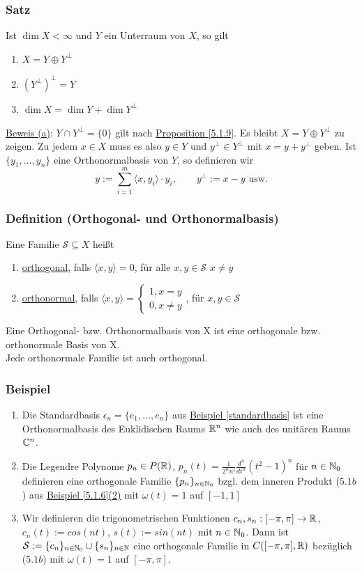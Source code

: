 \subsubsection{Satz}
\label{5.1.10}
Ist $\dim X<\infty$ und $Y$ ein Unterraum von $X$, so gilt
\alphabet
\begin{enumerate}
\item $X=Y\oplus Y^{\bot}$
\item $(Y^{\bot})^{\bot}=Y$
\item $\dim X=\dim Y+\dim Y^{\bot}$
\end{enumerate}
\underline{Beweis (a)}: $Y\cap Y^{\bot}=\{0\}$ gilt nach \hyperref[5.1.9]{Proposition \ref*{5.1.9}}. Es bleibt $X=Y\oplus Y^{\bot}$ zu zeigen. Zu jedem $x\in X$ muss es also $y\in Y$ und $y^{\bot}\in Y^{\bot}$ mit $x=y+y^{\bot}$ geben. Ist $\{y_1, \dots,y_n\}$ eine Orthonormalbasis von $Y$, so definieren wir
\[y:=\sum_{i=1}^m \langle x,y_i\rangle \cdot y_i,\qquad y^{\bot}:=x-y\text{ usw.}\]
\subsubsection{Definition (Orthogonal- und Orthonormalbasis)}
Eine Familie $\mathcal{S} \subseteq X$ heißt
\alphabet
\begin{enumerate}
\item \underline{orthogonal}, falls $\langle x,y\rangle=0$, für alle $x,y\in \mathcal{S}$ $x\neq y$
\item \underline{orthonormal}, falls $\langle x,y\rangle=\begin{cases}1,x=y\\0,x\neq y\end{cases}$, für $x,y\in \mathcal{S}$
\end{enumerate}
Eine Orthogonal- bzw. Orthonormalbasis von X ist eine orthogonale bzw. orthonormale Basis von X.\\
Jede orthonormale Familie ist auch orthogonal.
\subsubsection{Beispiel}
\label{5.1.12}
\numbers
\begin{enumerate}
\item Die Standardbasis $\epsilon_n=\{e_1,\dots,e_n\}$ aus \hyperref[standardbasis]{Beispiel \ref*{standardbasis}} ist eine Orthonormalbasis des Euklidischen Raums $\mathbb{R}^n$ wie auch des unitären Raums $\mathbb{C}^n$.
\item Die Legendre Polynome $p_n\in P(\mathbb{R})$, $p_n(t)=\frac{1}{2^n n!} \frac{d^n}{dt^n} (t^2-1)^n$ für $n\in\mathbb{N}_0$ definieren eine orthogonale Familie $\{p_n\}_{n\in\mathbb{N}_0}$ bzgl. dem inneren Produkt (\hyperref[5.1b]{$5.1b$}) aus \hyperref[5.1.6]{Beispiel \ref{5.1.6}(2)} mit $\omega(t)=1$ auf $[-1,1]$
\item Wir definieren die trigonometrischen Funktionen $c_n,s_n:[-\pi,\pi]\rightarrow\mathbb{R}$, $c_n(t):=cos(nt)$, $s(t):=sin(nt)$ mit $n\in\mathbb{N}_0$. Dann ist $\mathcal{S}:=\{c_n\}_{n\in\mathbb{N}_0} \cup \{s_n\}_{n\in\mathbb{N}}$ eine orthogonale Familie in $C([-\pi,\pi],\mathbb{R})$ bezüglich (\hyperref[5.1b]{$5.1b$}) mit $\omega(t)=1$ auf $[-\pi,\pi]$.
\end{enumerate}
